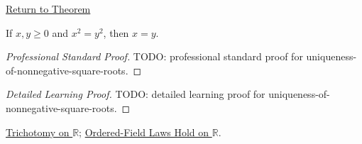 \newpage
{}
\label{prf:uniqueness-of-nonnegative-square-roots}

\begin{remark*}[Return]
\hyperref[thm:uniqueness-of-nonnegative-square-roots]{Return to Theorem}
\end{remark*}

\begin{theorem*}
If $x,y\ge 0$ and $x^2=y^2$, then $x=y$.
\end{theorem*}

\begin{proof}[Professional Standard Proof]
\LRAProofBodyStart
TODO: professional standard proof for uniqueness-of-nonnegative-square-roots.
\end{proof}

\begin{proof}[Detailed Learning Proof]
\LRAProofBodyStart
TODO: detailed learning proof for uniqueness-of-nonnegative-square-roots.
\end{proof}

\begin{remark*}
\end{remark*}

\begin{dependencies}
\hyperref[thm:trichotomy-on-r]{Trichotomy on $\mathbb{R}$};
\hyperref[cor:ordered-field-laws-on-r]{Ordered-Field Laws Hold on $\mathbb{R}$}.
\end{dependencies}

\clearpage
